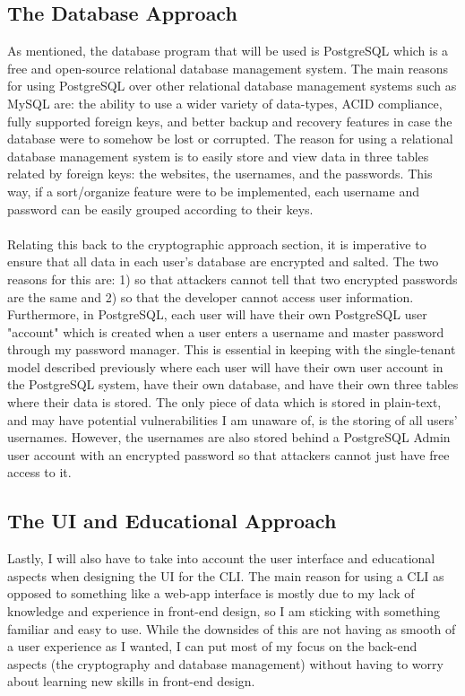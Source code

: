 \documentclass[10pt,twocolumn]{article}
\begin{document}
\subsection{The Database Approach}
As mentioned, the database program that will be used is PostgreSQL which is a free and open-source relational database management system. The main reasons for using PostgreSQL over other relational database management systems such as MySQL are: the ability to use a wider variety of data-types, ACID compliance, fully supported foreign keys, and better backup and recovery features in case the database were to somehow be lost or corrupted\cite{Smallcombe_2019}. The reason for using a relational database management system is to easily store and view data in three tables related by foreign keys: the websites, the usernames, and the passwords. This way, if a sort/organize feature were to be implemented, each username and password can be easily grouped according to their keys.

\paragraph{}
Relating this back to the cryptographic approach section, it is imperative to ensure that all data in each user's database are encrypted and salted. The two reasons for this are: 1) so that attackers cannot tell that two encrypted passwords are the same and 2) so that the developer cannot access user information. Furthermore, in PostgreSQL, each user will have their own PostgreSQL user "account" which is created when a user enters a username and master password through my password manager. This is essential in keeping with the single-tenant model described previously where each user will have their own user account in the PostgreSQL system, have their own database, and have their own three tables where their data is stored. The only piece of data which is stored in plain-text, and may have potential vulnerabilities I am unaware of, is the storing of all users' usernames. However, the usernames are also stored behind a PostgreSQL Admin user account with an encrypted password so that attackers cannot just have free access to it.

\subsection{The UI and Educational Approach}
Lastly, I will also have to take into account the user interface and educational aspects when designing the UI for the CLI. The main reason for using a CLI as opposed to something like a web-app interface is mostly due to my lack of knowledge and experience in front-end design, so I am sticking with something familiar and easy to use. While the downsides of this are not having as smooth of a user experience as I wanted, I can put most of my focus on the back-end aspects (the cryptography and database management) without having to worry about learning new skills in front-end design.
\end{document}
